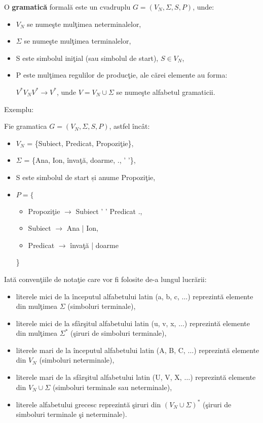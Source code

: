 \begin{definitie}
O \textbf{gramatică} formală este un cvadruplu $G = (V_{N}, \Sigma, S, P)$, unde:
\begin{itemize}
\item
$V_{N}$ se numeşte mulţimea neterminalelor,
\item
$\Sigma$ se numeşte mulţimea terminalelor,
\item
S este simbolul iniţial (sau simbolul de start), $S \in V_{N}$,
\item
P este mulţimea regulilor de producţie, ale cărei elemente au forma:

$V^{*}V_{N}V^{*} \rightarrow V^{*}$, unde $V = V_{N} \cup \Sigma$ se numeşte alfabetul gramaticii.
\end{itemize}
\end{definitie}

Exemplu:

Fie gramatica $G = (V_{N}, \Sigma, S, P)$, astfel încât:

\begin{itemize}
\item
$V_{N}$ = \{Subiect, Predicat, Propoziţie\},
\item
$\Sigma$ = \{Ana, Ion, învaţă, doarme, ., ' '\},
\item
S este simbolul de start și anume Propoziţie,
\item
$P = \{$
\begin{itemize}
\item
Propoziţie $\rightarrow$ Subiect ' ' Predicat .,
\item
Subiect $\rightarrow$ Ana | Ion,
\item
Predicat $\rightarrow$ învaţă | doarme
\end{itemize}
\}
\end{itemize}

Iată convenţiile de notaţie care vor fi folosite de-a lungul lucrării:
\begin{itemize}
\item
literele mici de la începutul alfabetului latin (a, b, c, $\dots$) reprezintă elemente din mulţimea $\Sigma$ (simboluri terminale),
\item
literele mici de la sfârşitul alfabetului latin (u, v, x, $\dots$) reprezintă elemente din mulţimea $\Sigma^{*}$ (şiruri de simboluri terminale),
\item
literele mari de la începutul alfabetului latin (A, B, C, $\dots$) reprezintă elemente din $V_{N}$ (simboluri neterminale),
\item
literele mari de la sfârşitul alfabetului latin (U, V, X, $\dots$) reprezintă elemente din $V_{N} \cup \Sigma$ (simboluri terminale sau neterminale),
\item
literele alfabetului grecesc reprezintă şiruri din $(V_{N} \cup \Sigma)^{*}$ (şiruri de simboluri terminale şi neterminale).
\end{itemize}

